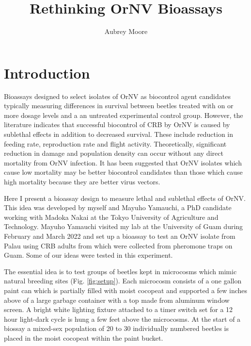 \documentclass[twocolumn, 12pt,letterpaper,english,bibliography=totocnumbered, abstract=on]{scrartcl}
\begin{document}

\title{Rethinking OrNV Bioassays}

\author{Aubrey Moore}


\maketitle
\tableofcontents


\nocite{*}

\section{Introduction}

Bioassays designed to select isolates of OrNV as biocontrol agent candidates typically measuring differences in survival between beetles treated with on or more dosage levels and a an untreated experimental control group. However, the literature indicates that successful biocontrol of CRB by OrNV is caused by sublethal effects in addition to decreased survival. These include reduction in feeding rate, reproduction rate and flight activity. Theoretically, significant reduction in damage and population density can occur without any direct mortality from OrNV infection. It has been suggested that OrNV isolates which cause low mortality may be better biocontrol candidates than those which cause high mortality because they are better virus vectors.

Here I present a bioassay design to measure lethal and sublethal effects of OrNV. This idea was developed by myself and Mayuho Yamauchi, a PhD candidate working with Madoka Nakai at the Tokyo University of Agriculture and Technology. Mayuho Yamauchi visited my lab at the University of Guam during February and March 2022 and set up a bioassay to test an OrNV isolate from Palau using CRB adults from which were collected from pheromone traps on Guam. Some of our ideas were tested in this experiment.

The essential idea is to test groups of beetles kept in microcosms which mimic natural breeding sites (Fig. \ref{fig:setup}). Each microcosm consists of a one gallon paint can which is partially filled with moist cocopeat and supported a few inches above of a large garbage container with a top made from aluminum window screen. A bright white lighting fixture attached to a timer switch set for a 12 hour light-dark cycle is hung a few feet above the microcosms. At the start of a biossay a mixed-sex population of 20 to 30 individually numbered beetles is placed in the moist cocopeat within the paint bucket.  
\end{document}
